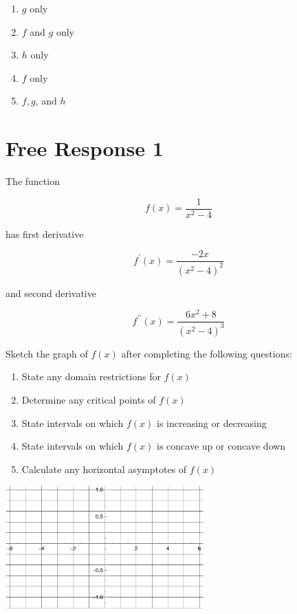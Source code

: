 \documentclass{article}
\begin{document}
\begin{enumerate}
\begin{minipage}[t]{\linewidth}
\vspace{1em}
		\begin{enumerate}
		\itemsep1em
			\item \(g\) only
			\item \(f\) and \(g\) only
			\item \(h\) only
			\item \(f\) only
			\item \(f, g\), and \(h\)
		\end{enumerate}
	\end{minipage}
\end{enumerate}


\clearpage
\section{Free Response 1}

The function

$$
f(x)=\frac{1}{x^{2}-4}
$$

has first derivative

$$
f^{\prime}(x)=\frac{-2 x}{\left(x^{2}-4\right)^{2}}
$$

and second derivative

$$
f^{\prime \prime}(x)=\frac{6 x^{2}+8}{\left(x^{2}-4\right)^{3}}
$$

Sketch the graph of $f(x)$ after completing the following questions:

\begin{enumerate}
	\setlength{\itemsep}{0.65in}
	\item State any domain restrictions for $f(x)$
	\item Determine any critical points of $f(x)$
	\item State intervals on which $f(x)$ is increasing or decreasing
	\item State intervals on which $f(x)$ is concave up or concave down
	\item Calculate any horizontal asymptotes of $f(x)$
\end{enumerate}
\vspace{0.5in}
\begin{center}
\includegraphics*[width=3in]{media/grid.png}
\end{center}
\end{document}

